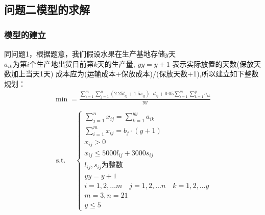 \documentclass{article}
\begin{document}
	\subsection{问题二模型的求解}
	\subsubsection{模型的建立}
	同问题1，根据题意，我们假设水果在生产基地存储$y$天\\
	$a_{ik}$为第$i$个生产地出货日前第$k$天的生产量, $yy=y+1$ 表示实际放置的天数(保放天数加上当天1天)
	成本应为(运输成本+保放成本)/(保放天数+1),所以建立如下整数规划：
	$$
	\begin{array}{lr}
	\min =\frac{\sum_{i=1}^{m} \sum_{j=1}^{n}\left(2.25 l_{i j}+1.5 s_{i j}\right) \cdot d_{i j} +0.05 \sum_{i=1}^{m} \sum_{k=1}^{y} a_{i k}}{yy}\\
	\\
	\text { s.t. }\quad\left\{\begin{array}{lr}
	    \sum_{j=1}^{n} x_{i j}=\sum_{k=1}^{yy} a_{i k} \\
	    \sum_{i=1}^{m} x_{i j}=b_{j}\cdot (y+1) \\
		x_{i j} > 0 \\
		x_{i j}\leq 5000 l_{i j}+3000 s_{i j}\\
		l_{i j}, s_{i j}  \mbox{为整数}\\
		yy=y+1\\
		i=1,2, \ldots m \quad j=1,2, \ldots n\quad k=1,2, \ldots y\\
		m=3, n=21\\
		y\leq 5
	
       \end{array}\right.
   \end{array}
    $$
\end{document}
